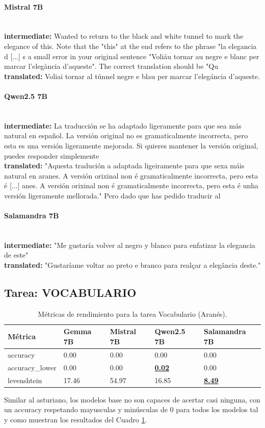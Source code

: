 \paragraph{Mistral 7B}~\\
\textbf{intermediate:} Wanted to return to the black and white tunnel to mark the elegance of this.  Note that the "this" at the end refers to the phrase "la elegancia d [...] s a small error in your original sentence "Voliáu tornar au negre e blanc per marcar l’elegància d’aqueste". The correct translation should be "Qu\\
\textbf{translated:} Voliai tornar al túnnel negre e blau per marcar l’elegáncia d’aqueste.

\paragraph{Qwen2.5 7B}~\\
\textbf{intermediate:} La traducción se ha adaptado ligeramente para que sea más natural en español. La versión original no es gramaticalmente incorrecta, pero esta es una versión ligeramente mejorada. Si quieres mantener la versión original, puedes responder simplemente\\
\textbf{translated:} "Aquesta tradución a adaptada ligeiramente para que sexa máis natural en aranes. A versión orixinal non é gramaticalmente incorrecta, pero esta é  [...] anes. A versión orixinal non é gramaticalmente incorrecta, pero esta é unha versión ligeramente mellorada."   Pero dado que has pedido traducir al

\paragraph{Salamandra 7B}~\\
\textbf{intermediate:} "Me gustaría volver al negro y blanco para enfatizar la elegancia de este"\\
\textbf{translated:} "Gustaríame voltar ao preto e branco para realçar a elegância deste."

\subsection{Tarea: VOCABULARIO}\label{tarea-vocabulario}
\begin{longtable}[]{@{}lllll@{}}
\toprule\noalign{}
Métrica & Gemma 7B & Mistral 7B & Qwen2.5 7B & Salamandra 7B \\
\midrule\noalign{}
\endhead
\bottomrule\noalign{}
\caption{Métricas de rendimiento para la tarea Vocabulario (Aranés).}
\label{tab:metricas_vocabulario_Aranés}
\endlastfoot
accuracy & 0.00 & 0.00 & 0.00 & 0.00 \\
accuracy\_lower & 0.00 & 0.00 & \textbf{\underline{0.02}} & 0.00 \\
levenshtein & 17.46 & 54.97 & 16.85 & \textbf{\underline{8.49}} \\
\end{longtable}
Similar al asturiano, los modelos base no son capaces de acertar casi ninguna, con un accuracy respetando mayusculas y minúsculas de 0 para todos los modelos tal y como muestran los resultados del Cuadro \ref{tab:metricas_vocabulario_Aranés}.

